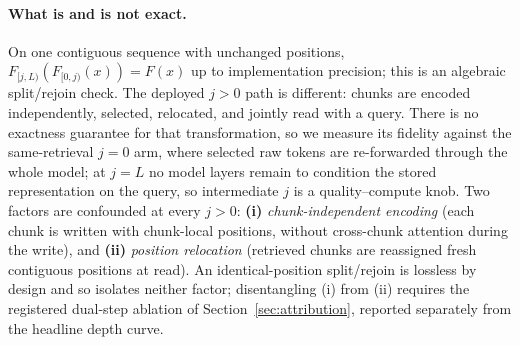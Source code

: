 \paragraph{What is and is not exact.}
On one contiguous sequence with unchanged positions,
$F_{[j,L)}(F_{[0,j)}(x))=F(x)$ up to implementation precision; this is an
algebraic split/rejoin check.  The deployed $j>0$ path is different: chunks are
encoded independently, selected, relocated, and jointly read with a query.  There
is no exactness guarantee for that transformation, so we measure its fidelity
against the same-retrieval $j=0$ arm, where selected raw tokens are re-forwarded
through the whole model; at $j=L$ no model layers remain to condition the stored
representation on the query, so intermediate $j$ is a quality--compute knob.  Two
factors are confounded at every $j>0$: \textbf{(i)} \emph{chunk-independent
encoding} (each chunk is written with chunk-local positions, without cross-chunk
attention during the write), and \textbf{(ii)} \emph{position relocation}
(retrieved chunks are reassigned fresh contiguous positions at read).  An
identical-position split/rejoin is lossless by design and so isolates neither
factor; disentangling (i) from (ii) requires the registered dual-step ablation of
Section~\ref{sec:attribution}, reported separately from the headline depth
curve.
